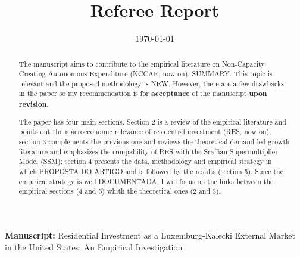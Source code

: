 \documentclass[11pt]{article}
\date{\today}
\title{Referee Report}
\begin{document}
\maketitle
\noindent \textbf{Manuscript:} Residential Investment as a Luxemburg-Kalecki External Market in the United States: An Empirical Investigation

\begin{abstract}
The manuscript aims to contribute to the empirical literature on Non-Capacity Creating Autonomous Expenditure (NCCAE, now on). SUMMARY. This topic is relevant and the proposed methodology is NEW. However, there are a few drawbacks in the paper so my recommendation is for \textbf{acceptance} of the manuscript \textbf{upon revision}.

The paper has four main sections. Section 2 is a review of the empirical literature and points out the macroeconomic relevance of residential investment (RES, now on); section 3 complements the previous one and reviews the theoretical demand-led growth literature and emphasizes the compability of RES with the Sraffian Supermultiplier Model (SSM); section 4 presents the data, methodology and empirical strategy in which PROPOSTA DO ARTIGO and is followed by the results (section 5). Since the empirical strategy is well DOCUMENTADA, I will focus on the links between the empirical sections (4 and 5) whith the theoretical ones (2 and 3).
\end{abstract}
\end{document}

